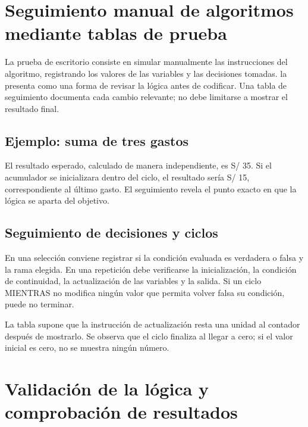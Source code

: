 \section{Seguimiento manual de algoritmos mediante tablas de prueba}

La prueba de escritorio consiste en simular manualmente las instrucciones del algoritmo, registrando los valores de las variables y las decisiones tomadas. \textcite[p.~10]{farrell2013} la presenta como una forma de revisar la lógica antes de codificar. Una tabla de seguimiento documenta cada cambio relevante; no debe limitarse a mostrar el resultado final.

\subsection{Ejemplo: suma de tres gastos}




El resultado esperado, calculado de manera independiente, es S/ 35. Si el acumulador se inicializara dentro del ciclo, el resultado sería S/ 15, correspondiente al último gasto. El seguimiento revela el punto exacto en que la lógica se aparta del objetivo.

\subsection{Seguimiento de decisiones y ciclos}

En una selección conviene registrar si la condición evaluada es verdadera o falsa y la rama elegida. En una repetición debe verificarse la inicialización, la condición de continuidad, la actualización de las variables y la salida. Si un ciclo MIENTRAS no modifica ningún valor que permita volver falsa su condición, puede no terminar.



La tabla supone que la instrucción de actualización resta una unidad al contador después de mostrarlo. Se observa que el ciclo finaliza al llegar a cero; si el valor inicial es cero, no se muestra ningún número.

\section{Validación de la lógica y comprobación de resultados}

